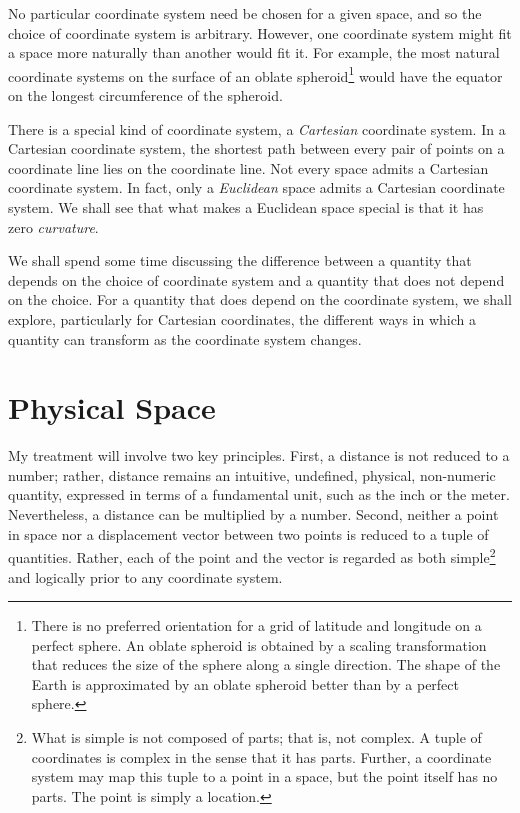 No particular coordinate system need be chosen for a given space, and so the
choice of coordinate system is arbitrary.  However, one coordinate system might
fit a space more naturally than another would fit it.  For example, the most
natural coordinate systems on the surface of an oblate spheroid\footnote{%
   There is no preferred orientation for a grid of latitude and longitude on a
   perfect sphere.  An oblate spheroid is obtained by a scaling transformation
   that reduces the size of the sphere along a single direction.  The shape of
   the Earth is approximated by an oblate spheroid better than by a perfect
   sphere.%
}
would have the equator on the longest circumference of the spheroid.

There is a special kind of coordinate system, a \emph{Cartesian} coordinate
system.  In a Cartesian coordinate system, the shortest path between every pair
of points on a coordinate line lies on the coordinate line.  Not every space
admits a Cartesian coordinate system.  In fact, only a \emph{Euclidean} space
admits a Cartesian coordinate system.  We shall see that what makes a Euclidean
space special is that it has zero \emph{curvature}.

We shall spend some time discussing the difference between a quantity that
depends on the choice of coordinate system and a quantity that does not depend
on the choice.  For a quantity that does depend on the coordinate system, we
shall explore, particularly for Cartesian coordinates, the different ways in
which a quantity can transform as the coordinate system changes.

\section{Physical Space}

My treatment will involve two key principles.  First, a distance is not reduced
to a number; rather, distance remains an intuitive, undefined, physical,
non-numeric quantity, expressed in terms of a fundamental unit, such as the
inch or the meter.  Nevertheless, a distance can be multiplied by a number.
Second, neither a point in space nor a displacement vector between two points
is reduced to a tuple of quantities.  Rather, each of the point and the vector
is regarded as both simple\footnote{%
   What is simple is not composed of parts; that is, not complex.  A tuple of
   coordinates is complex in the sense that it has parts.  Further, a
   coordinate system may map this tuple to a point in a space, but the point
   itself has no parts.  The point is simply a location.%
}
and logically prior to any coordinate system.

